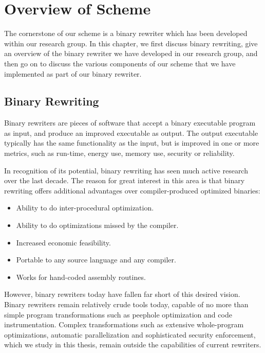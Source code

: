 
\renewcommand{\thechapter}{3}

\chapter{Overview of Scheme}

The cornerstone of our scheme is a binary rewriter which has been developed within our research
group. In this chapter, we first discuss binary rewriting, give an overview of the binary rewriter
we have developed in our research group, and then go on to discuss the various components of our
scheme that we have implemented as part of our binary rewriter.

\section{Binary Rewriting}

Binary rewriters are pieces of software that accept a binary executable program as input, and
produce an improved executable as output. The output executable typically has the same functionality
as the input, but is improved in one or more metrics, such as run-time, energy use, memory use,
security or reliability. 

In recognition of its potential, binary rewriting has seen much active research over the last
decade. The reason for great interest in this area is that binary rewriting offers additional
advantages over compiler-produced optimized binaries:

\begin{itemize}

\item Ability to do inter-procedural optimization.

\item Ability to do optimizations missed by the compiler.

\item Increased economic feasibility.

\item Portable to any source language and any compiler.

\item Works for hand-coded assembly routines.

\end{itemize}

However, binary rewriters today have fallen far short of this desired vision. Binary rewriters
remain relatively crude tools today, capable of no more than simple program transformations such as
peephole optimization and code instrumentation. Complex transformations such as extensive
whole-program optimizations, automatic parallelization and sophisticated security enforcement, which
we study in this thesis, remain outside the capabilities of current rewriters.

